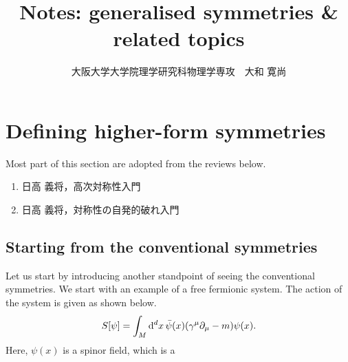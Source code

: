 \documentclass{article}
\title{{\bf Notes: generalised symmetries \& related topics}}
\author{大阪大学大学院理学研究科物理学専攻　大和 寛尚}
\date{}
\theoremstyle{definition}
\numberwithin{equation}{section}
\begin{document}
\maketitle
\tableofcontents

\section{Defining higher-form symmetries}
Most part of this section are adopted from the reviews below.
\begin{enumerate}
\item 日高 義将，高次対称性入門
\item 日高 義将，対称性の自発的破れ入門
\end{enumerate}

\subsection{Starting from the conventional symmetries}
Let us start by introducing another standpoint of seeing the conventional symmetries. We start with an example of a free fermionic system. The action of the system is given as shown below.
\begin{align}
  S[\psi] = \int_{M} \dd^d x\, \bar{\psi}(x) \qty(\gamma^\mu\partial_\mu - m) \psi(x).
\end{align}
Here, $\psi(x)$ is a spinor field, which is a 
\end{document}
